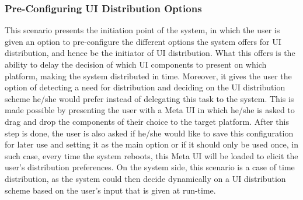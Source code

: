 \subsubsection{Pre-Configuring UI Distribution Options}
This scenario presents the initiation point of the system, in which the user is given an option to pre-configure the different options the system offers for UI distribution, and hence be the initiator of UI distribution.
What this offers is the ability to delay the decision of which UI components to
present on which platform, making the system distributed in time. Moreover, it
gives the user the option of detecting a need for distribution and deciding on
the UI distribution scheme he/she would prefer instead of delegating this task
to the system. This is made possible by presenting the user with a Meta UI in
which he/she is asked to drag and drop the components of their choice to the
target platform. After this step is done, the user is also asked if he/she would
like to save this configuration for later use and setting it as the main option
or if it should only be used once, in such case, every time the system reboots,
this Meta UI will be loaded to elicit the user's distribution preferences. On
the system side, this scenario is a case of time distribution, as the system
could then decide dynamically on a UI distribution scheme based on the user's
input that is given at run-time.

